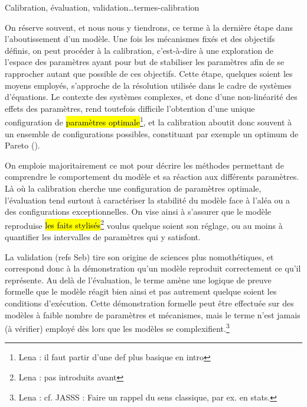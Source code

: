 \documentclass[12pt, a4paper, oneside]{book}
\begin{document}
	\begin{encadre}{Calibration, évaluation, validation\ldots}{termes-calibration}
		\begin{description}[style=nextline]	
			\item[Calibration] On réserve souvent, et nous nous y tiendrons, ce terme à la dernière étape dans l'aboutissement d'un modèle.
			Une fois les mécanismes fixés et des objectifs définis, on peut procéder à la calibration, c'est-à-dire à une exploration de l'espace des paramètres ayant pour but de stabiliser les paramètres afin de se rapprocher autant que possible de ces objectifs.
			Cette étape, quelques soient les moyens employés, s'approche de la résolution utilisée dans le cadre de systèmes d'équations.
			Le contexte des systèmes complexes, et donc d'une non-linéarité des effets des paramètres, rend toutefois difficile l'obtention d'une unique configuration de \hl{paramètres optimale}\footnote{Lena : il faut partir d'une def plus basique en intro}, et la calibration aboutit donc souvent à un ensemble de configurations possibles, constituant par exemple un optimum de Pareto ().
			
			\item[Évaluation] On emploie majoritairement ce mot pour décrire les méthodes permettant de comprendre le comportement du modèle et sa réaction aux différents paramètres.
			Là où la calibration cherche une configuration de paramètres optimale, l'évaluation tend surtout à caractériser la stabilité du modèle face à l'aléa ou a des configurations exceptionnelles.
			On vise ainsi à s'assurer que le modèle reproduise \hl{les faits stylisés}\footnote{Lena : pas introduits avant} voulus quelque soient son réglage, ou au moins à quantifier les intervalles de paramètres qui y satisfont.
			
			\item[Validation] La validation (refs Seb) tire son origine de sciences plus nomothétiques, et correspond donc à la démonstration qu'un modèle reproduit correctement ce qu'il représente. Au delà de l'évaluation, le terme amène une logique de preuve formelle que le modèle réagit bien ainsi et pas autrement quelque soient les conditions d'exécution. Cette démonstration formelle peut être effectuée sur des modèles à faible nombre de paramètres et mécanismes, mais le terme n'est jamais (à vérifier) employé dès lors que les modèles se complexifient.\footnote{Lena : cf. JASSS : Faire un rappel du sens classique, par ex. en stats.}
		\end{description}
	\end{encadre}
	
\end{document}
